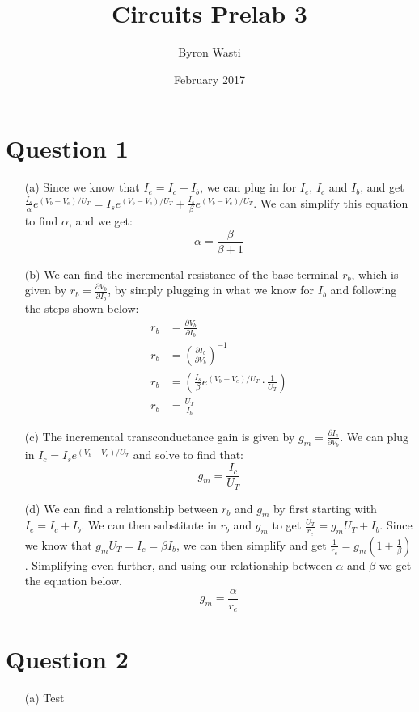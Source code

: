 \documentclass{article}
\title{Circuits Prelab 3}
\author{Byron Wasti}
\date{February 2017}
\begin{document}
\maketitle

\section{Question 1}
\begin{itemize}
    \item [(a)] 
        Since we know that $I_e = I_c + I_b$, we can plug in for $I_e$, $I_c$ and $I_b$, and get $\frac{I_s}{\alpha}e^{(V_b - V_e)/U_T} = I_se^{(V_b - V_e)/U_T} + \frac{I_s}{\beta}e^{(V_b - V_e)/U_T}$. We can simplify this equation to find $\alpha$, and we get:
        \begin{equation*}
            \alpha = \frac{\beta}{\beta + 1}
        \end{equation*}

    \item [(b)]
        We can find the incremental resistance of the base terminal $r_b$, which is given by $r_b = \frac{\partial V_b}{\partial I_b}$, by simply plugging in what we know for $I_b$ and following the steps shown below:
        \begin{align*}
            r_b &= \frac{\partial V_b}{\partial I_b}\\
            r_b &= \left(\frac{\partial I_b}{\partial V_b}\right)^{-1}\\
            r_b &= \left( \frac{I_s}{\beta}e^{(V_b - V_e)/U_T}\cdot \frac{1}{U_T} \right)\\
            r_b &= \frac{U_T}{I_b}
        \end{align*}

    \item [(c)]
        The incremental transconductance gain is given by $g_m = \frac{ \partial I_c }{ \partial V_b }$. We can plug in $I_c = I_se^{(V_b - V_e)/U_T}$ and solve to find that:
        \begin{equation*}
            g_m = \frac{ I_c }{ U_T }
        \end{equation*}

    \item [(d)]
        We can find a relationship between $r_b$ and $g_m$ by first starting with $I_e = I_c + I_b$. We can then substitute in $r_b$ and $g_m$ to get $\frac{U_T}{r_e} = g_mU_T + I_b$. Since we know that $g_mU_T = I_c = \beta I_b$, we can then simplify and get $\frac{1}{r_e} = g_m (1 + \frac{1}{\beta})$. Simplifying even further, and using our relationship between $\alpha$ and $\beta$ we get the equation below.
        \begin{equation*}
            g_m = \frac{\alpha}{r_e}
        \end{equation*}

\end{itemize}

\section{Question 2}
\begin{itemize}
    \item[(a)] Test

\end{itemize}
\end{document}
